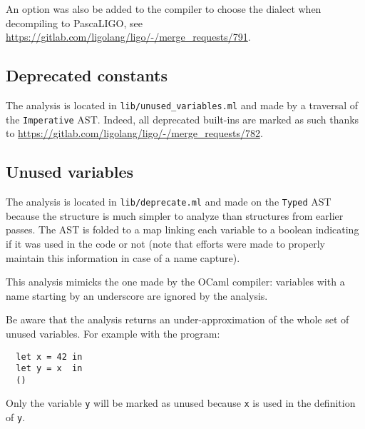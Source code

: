 \documentclass[10pt,a4paper]{article}
\begin{document}
An option was also be added to the compiler to choose the dialect when
decompiling to PascaLIGO, see
\url{https://gitlab.com/ligolang/ligo/-/merge_requests/791}.

\subsection{Deprecated constants}

The analysis is located in \verb|lib/unused_variables.ml| and made by
a traversal of the \verb|Imperative| AST. Indeed, all deprecated
built-ins are marked as such thanks to
\url{https://gitlab.com/ligolang/ligo/-/merge_requests/782}.


\subsection{Unused variables}

The analysis is located in \verb|lib/deprecate.ml| and made on the
\verb|Typed| AST because the structure is much simpler to analyze than
structures from earlier passes. The AST is folded to a map linking
each variable to a boolean indicating if it was used in the code or
not (note that efforts were made to properly maintain this information
in case of a name capture).

This analysis mimicks the one made by the OCaml compiler: variables
with a name starting by an underscore are ignored by the analysis.

Be aware that the analysis returns an under-approximation of the whole
set of unused variables.  For example with the program:
\begin{verbatim}
  let x = 42 in
  let y = x  in
  ()
\end{verbatim}

Only the variable \verb|y| will be marked as unused because
\verb|x| is used in the definition of \verb|y|.


{}
\end{document}
